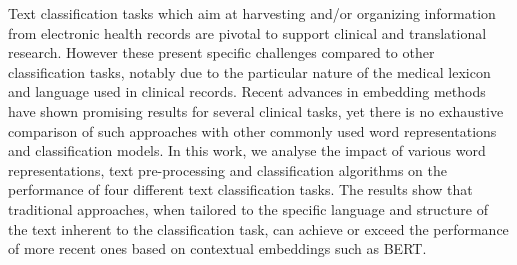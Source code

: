 Text classification tasks which aim at harvesting and/or organizing information from electronic health records are pivotal to support clinical and translational research. However these present specific challenges compared to other classification tasks, notably due to the particular nature of the medical lexicon and language used in clinical records. Recent advances in embedding methods have shown promising results for several clinical tasks, yet there is no exhaustive comparison of such approaches with other commonly used word representations and classification models. In this work, we analyse the impact of various word representations, text pre-processing and classification algorithms on the performance of four different text classification tasks. The results show that traditional approaches, when tailored to the specific language and structure of the text inherent to the classification task, can achieve or exceed the performance of more recent ones based on contextual embeddings such as BERT.
